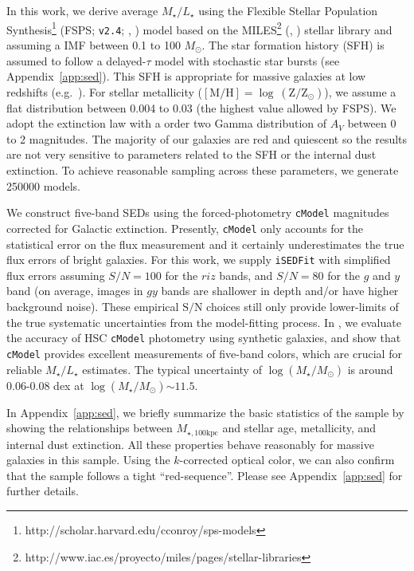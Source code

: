 \documentclass[a4paper,fleqn,usenatbib]{mnras}
\def\msun{$M_\odot$}
\def\cmodel{\texttt{cModel}}
\def\logms{{$\log (M_{\star}/M_{\odot})$}}
\def\mtot{{$M_{\star,100\mathrm{kpc}}$}}
\def\m2l{{$M_{\star}/L_{\star}$}}
\def\s2n{{$\mathrm{S}/\mathrm{N}$}}
\begin{document}
    In this work, we derive average \m2l{} using the Flexible Stellar Population 
    Synthesis\footnote{http://scholar.harvard.edu/cconroy/sps-models}
    (FSPS; \texttt{v2.4}; \citealt{FSPS}, \citealt{Conroy2010}) model based on the 
    MILES\footnote{http://www.iac.es/proyecto/miles/pages/stellar-libraries}
    (\citealt{MILES1}, \citealt{MILES2}) stellar library and assuming a
    \citet{Chabrier2003} IMF between 0.1 to 100 \msun. 
    The star formation history (SFH) is assumed to follow a delayed-$\tau$ model with 
    stochastic star bursts (see Appendix~\ref{app:sed}). 
    This SFH is appropriate for massive galaxies at low redshifts 
    (e.g.\ \citealt{Kauffmann2003}). 
    For stellar metallicity 
    ($[\mathrm{M}/\mathrm{H}]=\log\ (\mathrm{Z}/\mathrm{Z}_{\odot})$), we assume a 
    flat distribution between 0.004 to 0.03 (the highest value allowed by FSPS).
    We adopt the \citet{Calzetti2000} extinction law with a order two Gamma 
    distribution of $A_{V}$ between 0 to 2 magnitudes. 
    The majority of our galaxies are red and quiescent so the results are not 
    very sensitive to parameters related to the SFH or the internal dust extinction. 
    To achieve reasonable sampling across these parameters, we generate 250000 
    models. 
    
    We construct five-band SEDs using the forced-photometry \cmodel{} magnitudes 
    corrected for Galactic extinction. 
    Presently, \cmodel{} only accounts for the statistical error on the flux 
    measurement and it certainly underestimates the true flux errors of bright 
    galaxies.  
    For this work, we supply \texttt{iSEDFit} with simplified flux errors assuming 
    $S/N = 100$ for the $riz$ bands, and $S/N = 80$ for the $g$ and $y$ band 
    (on average, images in $gy$ bands are shallower in depth and/or have higher 
    background noise).  
    These empirical \s2n{} choices still only provide lower-limits of the true 
    systematic uncertainties from the model-fitting process. 
    In \citealt{SynPipe}, we evaluate the accuracy of HSC \cmodel{} photometry 
    using synthetic galaxies, and show that \cmodel{} provides excellent measurements 
    of five-band colors, which are crucial for reliable \m2l{} estimates.
    The typical uncertainty of \logms{} is around 0.06-0.08 dex at \logms${\sim} 11.5$.
    
    In Appendix~\ref{app:sed}, we briefly summarize the basic statistics of 
    the sample by showing the relationships between \mtot{} and stellar age, 
    metallicity, and internal dust extinction. 
    All these properties behave reasonably for massive galaxies in this sample. 
    Using the $k$-corrected optical color, we can also confirm that the sample follows 
    a tight ``red-sequence''.  
    Please see Appendix~\ref{app:sed} for further details.
      
\end{document}
